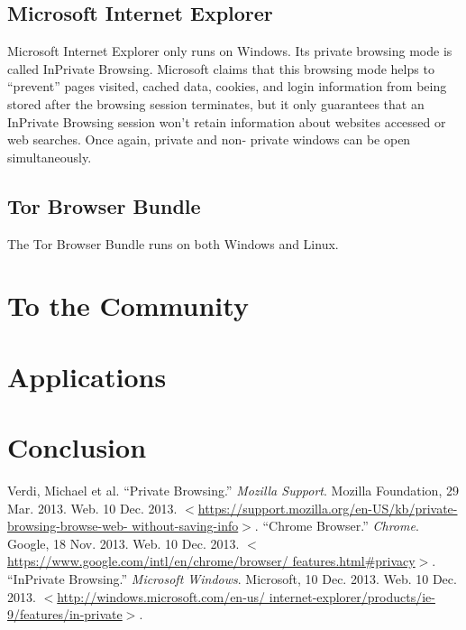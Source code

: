 \documentclass[pdftex,letterpaper,titlepage,11pt]{article}
\begin{document}
    \subsection{Microsoft Internet Explorer}
    Microsoft Internet Explorer only runs on Windows. Its private browsing mode
    is called InPrivate Browsing. Microsoft claims that this browsing mode
    helps to ``prevent'' pages visited, cached data, cookies, and login
    information from being stored after the browsing session terminates, but it
    only guarantees that an InPrivate Browsing session won't retain information
    about websites accessed or web searches. Once again, private and non-
    private windows can be open simultaneously.\cite{ie13}

    \subsection{Tor Browser Bundle}
    The Tor Browser Bundle runs on both Windows and Linux. 

  \section{To the Community}

  \section{Applications}

  \section{Conclusion}

  \begin{thebibliography}{9}
      Verdi, Michael et al. ``Private Browsing.'' \emph{Mozilla Support}. 
      Mozilla Foundation, 29 Mar. 2013. Web. 10 Dec. 2013. 
      $<$\url{https://support.mozilla.org/en-US/kb/private-browsing-browse-web-
      without-saving-info}$>$.
      ``Chrome Browser.'' \emph{Chrome}. Google, 18 Nov. 2013. Web. 10 Dec. 
      2013. $<$\url{https://www.google.com/intl/en/chrome/browser/
      features.html#privacy}$>$.
      ``InPrivate Browsing.'' \emph{Microsoft Windows}. Microsoft, 10 Dec. 
      2013. Web. 10 Dec. 2013. $<$\url{http://windows.microsoft.com/en-us/
      internet-explorer/products/ie-9/features/in-private}$>$.

  \end{thebibliography}
\end{document}
